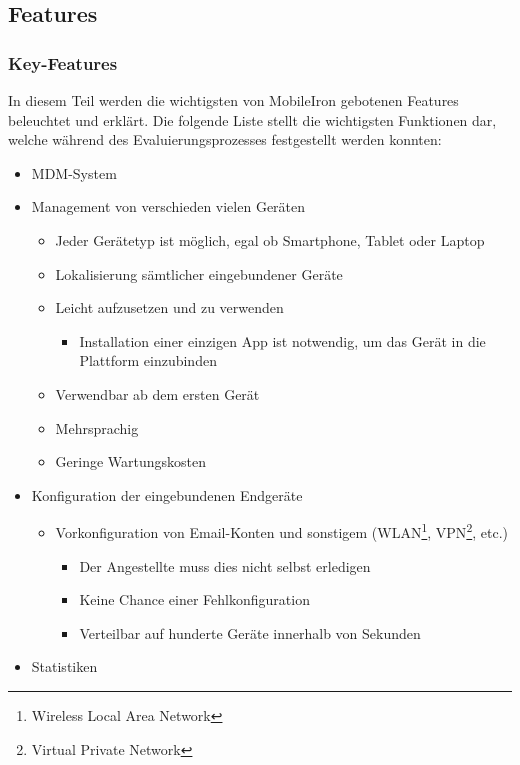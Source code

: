 \newpage

\subsection{Features}
\subsubsection{Key-Features}
In diesem Teil werden die wichtigsten von MobileIron gebotenen Features beleuchtet und erklärt. Die folgende Liste stellt die wichtigsten Funktionen dar, welche während des Evaluierungsprozesses festgestellt werden konnten:
\begin{itemize}
	\item MDM-System
	\item Management von verschieden vielen Geräten
	\begin{itemize}
		\item Jeder Gerätetyp ist möglich, egal ob Smartphone, Tablet oder Laptop
		\item Lokalisierung sämtlicher eingebundener Geräte
		\item Leicht aufzusetzen und zu verwenden
		\begin{itemize}
			\item Installation einer einzigen App ist notwendig, um das Gerät in die Plattform einzubinden
		\end{itemize}
		\item Verwendbar ab dem ersten Gerät
		\item Mehrsprachig
		\item Geringe Wartungskosten
	\end{itemize}
	\item Konfiguration der eingebundenen Endgeräte
	\begin{itemize}
		\item Vorkonfiguration von Email-Konten und sonstigem (WLAN\footnote{Wireless Local Area Network}, VPN\footnote{Virtual Private Network}, etc.)
		\begin{itemize}
			\item Der Angestellte muss dies nicht selbst erledigen
			\item Keine Chance einer Fehlkonfiguration
			\item Verteilbar auf hunderte Geräte innerhalb von Sekunden
		\end{itemize}
	\end{itemize}
	\item Statistiken
	\begin{itemize}

\end{itemize}
\end{itemize}
